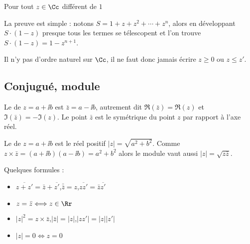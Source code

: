 \documentclass[class=report,crop=false]{standalone}
\begin{document}
\begin{proposition}
\label{prop:somme}
Pour tout $z \in \Cc$ différent de $1$
\vspace{-0.5em}
\end{proposition}

La preuve est simple : notons $S=1 + z + z^2 + \cdots + z^n$, alors en développant
$S \cdot (1 - z)$ presque tous les termes se télescopent et l'on trouve $S \cdot (1 - z) = 1 - z^{n + 1}$.


\begin{remarque*}
  Il n'y pas d'ordre naturel sur $\Cc$, il ne faut donc
  jamais écrire $z \geqslant 0$ ou $z \leqslant z'$.
\end{remarque*}


\subsection{Conjugué, module}

  Le  de $z = a + \ii b$ est $\bar{z} = a - \ii b$, autrement dit
  $\Re(\bar{z}) = \Re(z)$ et
  $\Im(\bar{z}) = - \Im (z)$.
  Le point $\bar{z}$ est le symétrique du point $z$ par rapport à l'axe réel.

  Le  de $z = a + \ii b$ est le réel positif $|z| = \sqrt{a^2 + b^2}$.
Comme $z \times \bar z = (a+\ii b)(a-\ii b) = a^2+b^2$ alors  le module vaut aussi $|z| = \sqrt{z\bar z}$.

Quelques formules :
\begin{itemize}
  \item $\overline{z + z'} = \bar{z} + \overline{z'}$,\quad $\overline{\bar{z}} =
  z$,\quad $\overline{zz'} = \bar{z}  \overline{z'}$

  \item $z = \bar{z} \Longleftrightarrow z \in \Rr$

  \item $\left| z \right|^2 = z \times \bar{z}$,\quad $\left| \bar{z} \right| =
  \left| z \right|$,\quad $\left| zz' \right| = |z| |z'|$

  \item $\left| z \right| = 0 \Longleftrightarrow z = 0$
\end{itemize}
\end{document}
